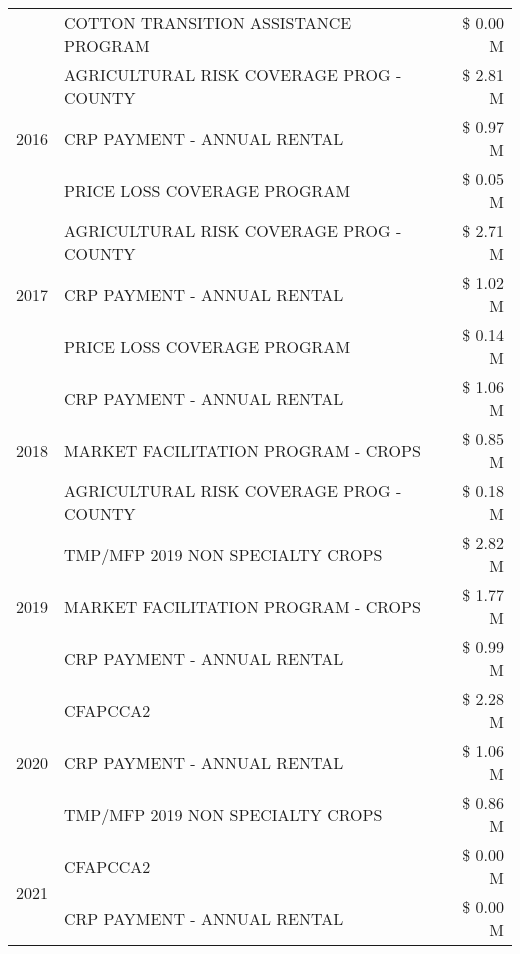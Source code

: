 \begin{tabular}{llr}
 & COTTON TRANSITION ASSISTANCE PROGRAM & \$ 0.00 M \\
\cline{1-3}
\multirow[t]{3}{*}{2016} & AGRICULTURAL RISK COVERAGE PROG - COUNTY & \$ 2.81 M \\
 & CRP PAYMENT - ANNUAL RENTAL & \$ 0.97 M \\
 & PRICE LOSS COVERAGE PROGRAM & \$ 0.05 M \\
\cline{1-3}
\multirow[t]{3}{*}{2017} & AGRICULTURAL RISK COVERAGE PROG - COUNTY & \$ 2.71 M \\
 & CRP PAYMENT - ANNUAL RENTAL & \$ 1.02 M \\
 & PRICE LOSS COVERAGE PROGRAM & \$ 0.14 M \\
\cline{1-3}
\multirow[t]{3}{*}{2018} & CRP PAYMENT - ANNUAL RENTAL & \$ 1.06 M \\
 & MARKET FACILITATION PROGRAM - CROPS & \$ 0.85 M \\
 & AGRICULTURAL RISK COVERAGE PROG - COUNTY & \$ 0.18 M \\
\cline{1-3}
\multirow[t]{3}{*}{2019} & TMP/MFP 2019 NON SPECIALTY CROPS & \$ 2.82 M \\
 & MARKET FACILITATION PROGRAM - CROPS & \$ 1.77 M \\
 & CRP PAYMENT - ANNUAL RENTAL & \$ 0.99 M \\
\cline{1-3}
\multirow[t]{3}{*}{2020} & CFAPCCA2 & \$ 2.28 M \\
 & CRP PAYMENT - ANNUAL RENTAL & \$ 1.06 M \\
 & TMP/MFP 2019 NON SPECIALTY CROPS & \$ 0.86 M \\
\cline{1-3}
\multirow[t]{2}{*}{2021} & CFAPCCA2 & \$ 0.00 M \\
 & CRP PAYMENT - ANNUAL RENTAL & \$ 0.00 M \\
\cline{1-3}
\bottomrule
\end{tabular}
